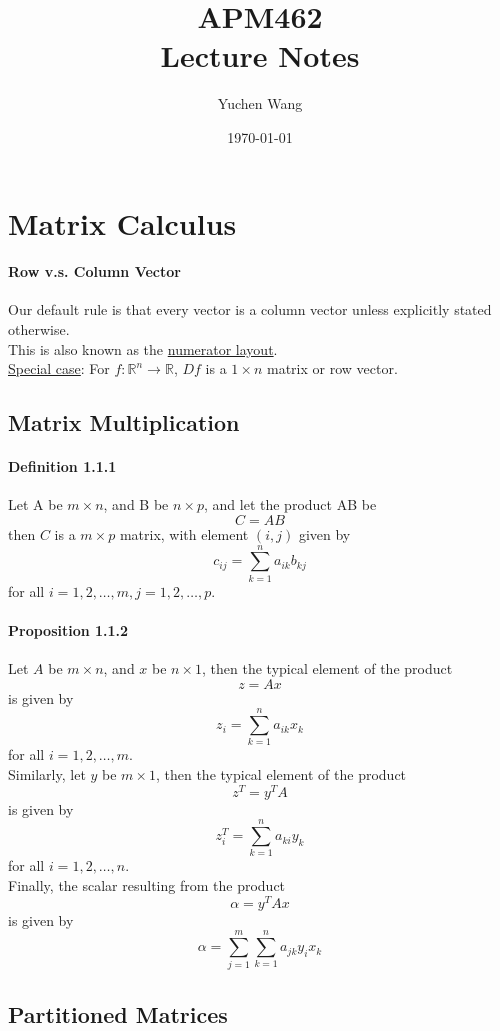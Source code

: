 \documentclass[11pt]{article}
\title{APM462 \\ Lecture Notes}
\author{Yuchen Wang}
\date{\today}
\newcommand{\real}[0]{\mathbb{R}}
\newcommand{\under}[1]{\underline{#1}}
\begin{document}
    \maketitle
    \tableofcontents
    \newpage
    
\section{Matrix Calculus}
\paragraph{Row v.s. Column Vector}
Our default rule is that every vector is a column vector unless explicitly stated otherwise. \\
This is also known as the \under{numerator layout}. \\
\under{Special case}: For $f: \real^n \rightarrow \real$, $Df$ is a $ 1 \times n$ matrix or row vector.

\subsection{Matrix Multiplication}
\paragraph{Definition 1.1.1}
Let A be $m \times n$, and B be $n \times p$, and let the product AB be
$$C = AB$$
then $C$ is a $m \times p$ matrix, with element $(i,j)$ given by
$$c_{ij} = \sum_{k=1}^n a_{ik}b_{kj}$$
for all $i = 1, 2, \hdots, m, j = 1,2,\hdots,p$.
\paragraph{Proposition 1.1.2}
Let $A$ be $m \times n$, and $x$ be $n \times 1$, then the typical element of the product
$$ z = Ax$$
is given by
$$z_i = \sum_{k=1}^n a_{ik}x_k$$
for all $i= 1,2,\hdots,m$.\\
Similarly, let $y$ be $m \times 1$, then the typical element of the product
$$z^T = y^TA$$
is given by
$$ z_i^T = \sum_{k=1}^n a_{ki}y_k$$
for all $i = 1, 2,\hdots, n$.  \\
Finally, the scalar resulting from the product
$$\alpha = y^T A x$$
is given by
$$\alpha = \sum_{j=1}^m\sum_{k=1}^n a_{jk}y_i x_k$$

\subsection{Partitioned Matrices}
\end{document}
